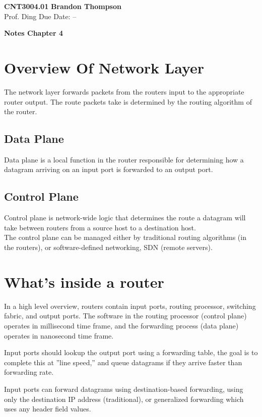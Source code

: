 \documentclass[12pt]{article}
\begin{document}
\noindent
\textbf{CNT3004.01} \hfill \textbf{Brandon Thompson} \\
\normalsize Prof. Ding \hfill Due Date: -- \\

\begin{center}
\textbf{Notes Chapter 4}
\end{center}
	\section{Overview Of Network Layer}
	The network layer forwards packets from the routers input to the appropriate router output. The route packets take is determined by the routing algorithm of the router.
	\subsection{Data Plane}
	Data plane is a local function in the router responsible for determining how a datagram arriving on an input port is forwarded to an output port.
	\subsection{Control Plane}
	Control plane is network-wide logic that determines the route a datagram will take between routers from a source host to a destination host.\\
	The control plane can be managed either by traditional routing algorithms (in the routers), or software-defined networking, SDN (remote servers).
	\section{What's inside a router}
	In a high level overview, routers contain input ports, routing processor, switching fabric, and output ports. The software in the routing processor (control plane) operates in millisecond time frame, and the forwarding process (data plane) operates in nanosecond time frame.

	Input ports should lookup the output port using a forwarding table, the goal is to complete this at ''line speed,'' and queue datagrams if they arrive faster than forwarding rate.

	Input ports can forward datagrams using destination-based forwarding, using only the destination IP address (traditional), or generalized forwarding which uses any header field values. 
\end{document}
